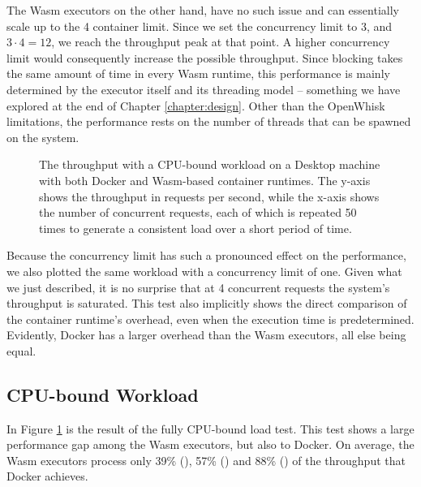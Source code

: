 The Wasm executors on the other hand, have no such issue and can essentially scale up to the 4 container limit. Since we set the concurrency limit to 3, and $3 \cdot 4 = 12$, we reach the throughput peak at that point. A higher concurrency limit would consequently increase the possible throughput. Since blocking takes the same amount of time in every Wasm runtime, this performance is mainly determined by the executor itself and its threading model -- something we have explored at the end of Chapter \ref{chapter:design}. Other than the OpenWhisk limitations, the performance rests on the number of threads that can be spawned on the system.

\begin{figure}
    \begin{center}
        
    \end{center}
    \caption{The throughput with a CPU-bound workload on a Desktop machine with both Docker and Wasm-based container runtimes. The y-axis shows the throughput in requests per second, while the x-axis shows the number of concurrent requests, each of which is repeated 50 times to generate a consistent load over a short period of time.}
    \label{fig:pc-load-hash}
\end{figure}

Because the concurrency limit has such a pronounced effect on the performance, we also plotted the same workload with a concurrency limit of one. Given what we just described, it is no surprise that at 4 concurrent requests the system's throughput is saturated. This test also implicitly shows the direct comparison of the container runtime's overhead, even when the execution time is predetermined. Evidently, Docker has a larger overhead than the Wasm executors, all else being equal.


\subsection{CPU-bound Workload}

In Figure \ref{fig:pc-load-hash} is the result of the fully CPU-bound load test. This test shows a large performance gap among the Wasm executors, but also to Docker. On average, the Wasm executors process only 39\% (), 57\% () and 88\% () of the throughput that Docker achieves.

